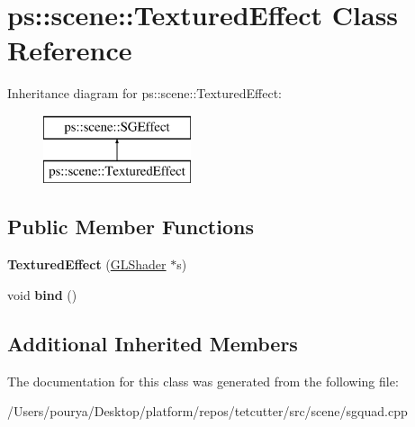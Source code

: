 \hypertarget{classps_1_1scene_1_1TexturedEffect}{}\section{ps\+:\+:scene\+:\+:Textured\+Effect Class Reference}
\label{classps_1_1scene_1_1TexturedEffect}
Inheritance diagram for ps\+:\+:scene\+:\+:Textured\+Effect\+:\begin{figure}[H]
\begin{center}
\leavevmode
\includegraphics[height=2.000000cm]{classps_1_1scene_1_1TexturedEffect}
\end{center}
\end{figure}
\subsection*{Public Member Functions}
\begin{DoxyCompactItemize}
\item 
\hypertarget{classps_1_1scene_1_1TexturedEffect_af378b17f296976df86c5e42d5d34ab8b}{}{\bfseries Textured\+Effect} (\hyperlink{classps_1_1opengl_1_1GLShader}{G\+L\+Shader} $\ast$s)\label{classps_1_1scene_1_1TexturedEffect_af378b17f296976df86c5e42d5d34ab8b}

\item 
\hypertarget{classps_1_1scene_1_1TexturedEffect_a97a35e1448b34688a3c1bccb3709b117}{}void {\bfseries bind} ()\label{classps_1_1scene_1_1TexturedEffect_a97a35e1448b34688a3c1bccb3709b117}

\end{DoxyCompactItemize}
\subsection*{Additional Inherited Members}


The documentation for this class was generated from the following file\+:\begin{DoxyCompactItemize}
\item 
/\+Users/pourya/\+Desktop/platform/repos/tetcutter/src/scene/sgquad.\+cpp\end{DoxyCompactItemize}
